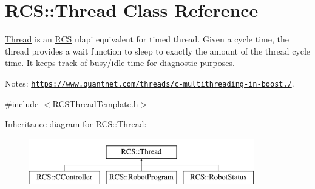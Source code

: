 \hypertarget{classRCS_1_1Thread}{\section{R\-C\-S\-:\-:Thread Class Reference}
\label{classRCS_1_1Thread}
}


\hyperlink{classRCS_1_1Thread}{Thread} is an \hyperlink{namespaceRCS}{R\-C\-S} ulapi equivalent for timed thread. Given a cycle time, the thread provides a wait function to sleep to exactly the amount of the thread cycle time. It keeps track of busy/idle time for diagnostic purposes. \par
 Notes\-: \href{https://www.quantnet.com/threads/c-multithreading-in-boost.10028/}{\tt https\-://www.\-quantnet.\-com/threads/c-\/multithreading-\/in-\/boost./}.  




{\ttfamily \#include $<$R\-C\-S\-Thread\-Template.\-h$>$}

Inheritance diagram for R\-C\-S\-:\-:Thread\-:\begin{figure}[H]
\begin{center}
\leavevmode
\includegraphics[height=2.000000cm]{classRCS_1_1Thread}
\end{center}
\end{figure}
